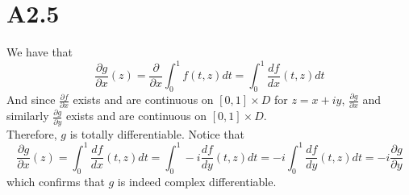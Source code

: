 \documentclass[11pt]{report}
\begin{document}
\section*{A2.5}
We have that 
\[
    \frac{\partial g}{\partial x}(z) = \frac{\partial }{\partial x} \int_0^1 f(t,z) dt = \int_0^1 \frac{df}{dx}(t,z) dt
\]
And since $\frac{\partial f}{\partial x}$ exists and are continuous on $[0,1]\times D$ for $z = x+iy$, 
$\frac{\partial g}{\partial x}$ and similarly $\frac{\partial g}{\partial y}$ exists and are continuous on $[0,1] \times D$. \\
Therefore, $g$ is totally differentiable.
Notice that 
\[
    \frac{\partial g}{\partial x}(z) = \int_0^1 \frac{df}{dx}(t,z) dt = \int_0^1  -i\frac{df}{dy}(t,z) dt  = -i \int_0^1 \frac{df}{dy}(t,z) dt = -i\frac{\partial g}{\partial y}
\]
which confirms that $g$ is indeed complex differentiable.
\end{document}
